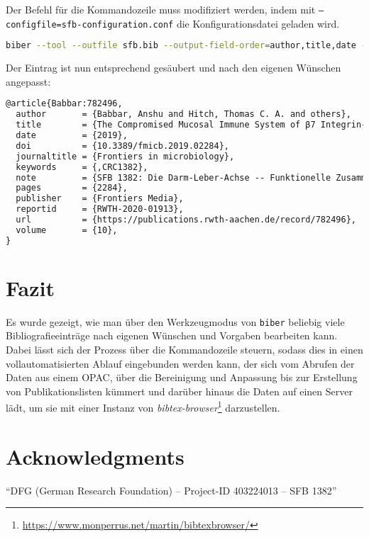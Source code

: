 \documentclass[ngerman]{dtk}
\begin{document}
Der  Befehl für die Kommandozeile muss modifiziert werden, 
indem mit \texttt{--configfile=sfb-configuration.conf} 
die Konfigurationsdatei geladen wird.
\begin{lstlisting}[style=nonumber,language=bash]
biber --tool --outfile sfb.bib --output-field-order=author,title,date --configfile=sfb-configuration.conf sfb.bib
\end{lstlisting}
Der Eintrag ist nun entsprechend gesäubert und nach den eigenen Wünschen angepasst:
\begin{lstlisting}[style=number,language=TeX]
@article{Babbar:782496,
  author       = {Babbar, Anshu and Hitch, Thomas C. A. and others},
  title        = {The Compromised Mucosal Immune System of β7 Integrin-Deficient Mice Has Only Minor Effects on the Fecal Microbiota in Homeostasis},
  date         = {2019},
  doi          = {10.3389/fmicb.2019.02284},
  journaltitle = {Frontiers in microbiology},
  keywords     = {,CRC1382},
  note         = {SFB 1382: Die Darm-Leber-Achse -- Funktionelle Zusammenhänge und therapeutische Strategien (403224013)},
  pages        = {2284},
  publisher    = {Frontiers Media},
  reportid     = {RWTH-2020-01913},
  url          = {https://publications.rwth-aachen.de/record/782496},
  volume       = {10},
}
\end{lstlisting}

\section{Fazit}
Es wurde gezeigt, wie man über den Werkzeugmodus von \texttt{biber} beliebig viele Bibliografieeinträge nach eigenen Wünschen und Vorgaben bearbeiten kann.
Dabei lässt sich der Prozess über die Kommandozeile steuern, sodass dies in einen vollautomatisierten Ablauf eingebunden werden kann, 
der sich vom Abrufen der Daten aus einem OPAC, über die Bereinigung und Anpassung bis zur Erstellung von Publikationslisten kümmert und darüber hinaus die Daten auf einen Server lädt,
um sie mit einer Instanz von \emph{bibtex-browser}\footnote{\url{https://www.monperrus.net/martin/bibtexbrowser/}} darzustellen.
\section{Acknowledgments}
``DFG (German Research Foundation) -- Project-ID 403224013 -- SFB 1382''
 \printbibliography
\end{document}
